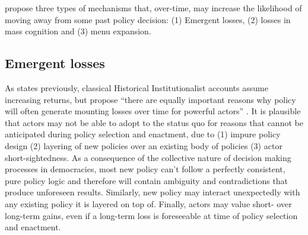 \documentclass[11pt]{article}
\begin{document}


\textcite[][]{Jacobs2014} propose three types of mechanisms that, over-time, may increase the likelihood of moving away from some past policy decision: (1) Emergent losses, (2) losses in mass cognition and (3) menu expansion.

\subsection*{Emergent losses}

As states previously, classical Historical Institutionalist accounts \textcite[][]{Pierson2000} assume increasing returns, but \textcite[][]{Jacobs2014} propose \enquote{there are equally important reasons why policy will often generate mounting losses over time for powerful actors} . It is plausible that actors may not be able to adopt to the status quo for reasons that cannot be anticipated during policy selection and enactment, due to (1) impure policy design (2) layering of new policies over an existing body of policies (3) actor short-sightedness. As a consequence of the collective nature of decision making processes in democracies, most new policy can't follow a perfectly consistent, pure policy logic and therefore will contain ambiguity and contradictions that produce unforeseen results. Similarly, new policy may interact unexpectedly with any existing policy it is layered on top of. Finally, actors may value short- over long-term gains, even if a long-term loss is foreseeable at time of policy selection and enactment.
\end{document}

